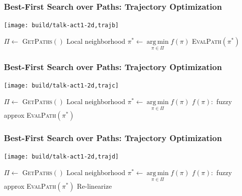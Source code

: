 \documentclass[serif]{beamer}
\DeclareMathOperator*{\argmin}{arg\,min}
\begin{document}
\begin{frame}
   \frametitle{Best-First Search over Paths: Trajectory Optimization}
   \begin{center}
      \texttt{[image: build/talk-act1-2d,trajb]}
      
      \begin{minipage}{0.8\textwidth}
      \begin{algorithmic}
      \Loop
         \State $\Pi \leftarrow $ \textsc{GetPaths}$()$
            \Comment Local neighborhood
         \State $\pi^* \leftarrow \argmin\limits_{\pi \in \Pi} f(\pi)$
            \Comment {}
         \State \textsc{EvalPath}$(\pi^*)$
            \Comment {}
      \EndLoop
      \end{algorithmic}
      \end{minipage}
   \end{center}
\end{frame}

\begin{frame}
   \frametitle{Best-First Search over Paths: Trajectory Optimization}
   \begin{center}
      \texttt{[image: build/talk-act1-2d,trajc]}
      
      \begin{minipage}{0.8\textwidth}
      \begin{algorithmic}
      \Loop
         \State $\Pi \leftarrow $ \textsc{GetPaths}$()$
            \Comment Local neighborhood
         \State $\pi^* \leftarrow \argmin\limits_{\pi \in \Pi} f(\pi)$
            \Comment $f(\pi):$ fuzzy approx
         \State \textsc{EvalPath}$(\pi^*)$
            \Comment {}
      \EndLoop
      \end{algorithmic}
      \end{minipage}
   \end{center}
\end{frame}

\begin{frame}
   \frametitle{Best-First Search over Paths: Trajectory Optimization}
   \begin{center}
      \texttt{[image: build/talk-act1-2d,trajd]}
      
      \begin{minipage}{0.8\textwidth}
      \begin{algorithmic}
      \Loop
         \State $\Pi \leftarrow $ \textsc{GetPaths}$()$
            \Comment Local neighborhood
         \State $\pi^* \leftarrow \argmin\limits_{\pi \in \Pi} f(\pi)$
            \Comment $f(\pi):$ fuzzy approx
         \State \textsc{EvalPath}$(\pi^*)$
            \Comment Re-linearize
      \EndLoop
      \end{algorithmic}
      \end{minipage}
   \end{center}
\end{frame}
\end{document}
